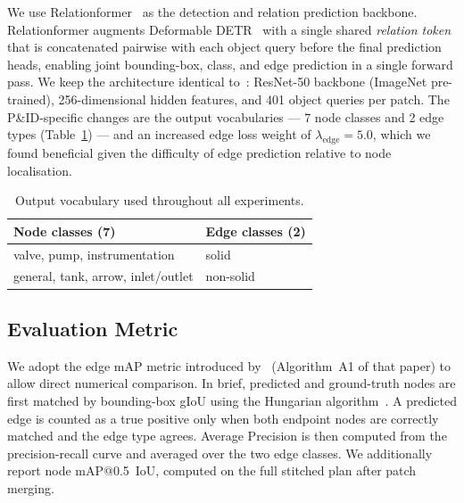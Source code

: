We use Relationformer~\cite{shit2022} as the detection and relation
prediction backbone.
Relationformer augments Deformable DETR~\cite{zhu2021} with a single
shared \emph{relation token} that is concatenated pairwise with each
object query before the final prediction heads, enabling joint
bounding-box, class, and edge prediction in a single forward pass.
We keep the architecture identical to~\cite{sturmer2025}: ResNet-50
backbone (ImageNet pre-trained), 256-dimensional hidden features,
and 401 object queries per patch.
The P\&ID-specific changes are the output vocabularies ---
7 node classes and 2 edge types (Table~\ref{tab:classes}) --- and
an increased edge loss weight of $\lambda_\text{edge}=5.0$,
which we found beneficial given the difficulty of edge prediction
relative to node localisation.

\begin{table}[h]
\centering
\caption{Output vocabulary used throughout all experiments.}
\label{tab:classes}
\small
\begin{tabular}{ll}
\toprule
\textbf{Node classes (7)} & \textbf{Edge classes (2)} \\
\midrule
valve, pump, instrumentation & solid \\
general, tank, arrow, inlet/outlet & non-solid \\
\bottomrule
\end{tabular}
\end{table}

\subsection{Evaluation Metric}
\label{sec:method:metric}

We adopt the edge mAP metric introduced by~\cite{sturmer2025}
(Algorithm~A1 of that paper) to allow direct numerical comparison.
In brief, predicted and ground-truth nodes are first matched by
bounding-box gIoU using the Hungarian algorithm~\cite{kuhn1955}.
A predicted edge is counted as a true positive only when both
endpoint nodes are correctly matched and the edge type agrees.
Average Precision is then computed from the precision-recall
curve and averaged over the two edge classes.
We additionally report node mAP@0.5~IoU, computed on the full
stitched plan after patch merging.
